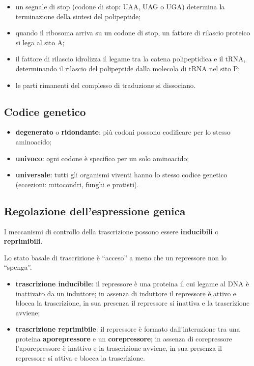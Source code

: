 \begin{itemize}
  \item un segnale di stop (codone di stop: UAA, UAG o UGA) determina la terminazione della sintesi del polipeptide;
  \item quando il ribosoma arriva su un codone di stop, un fattore di rilascio proteico si lega al sito A;
  \item il fattore di rilascio idrolizza il legame tra la catena polipeptidica e il tRNA, determinando il rilascio del polipeptide dalla molecola di tRNA nel sito P;
  \item le parti rimanenti del complesso di traduzione si dissociano.
\end{itemize}

\subsection{Codice genetico}

\begin{itemize}
  \item \textbf{degenerato} o \textbf{ridondante}: più codoni possono codificare per lo stesso aminoacido;
  \item \textbf{univoco}: ogni codone è specifico per un solo aminoacido;
  \item \textbf{universale}: tutti gli organismi viventi hanno lo stesso codice genetico (eccezioni: mitocondri, funghi e protisti).
\end{itemize}
\subsection{Regolazione dell'espressione genica}

I meccanismi di controllo della trascrizione possono essere \textbf{inducibili} o \textbf{reprimibili}.

Lo stato basale di trascrizione è ``acceso'' a meno che un repressore non lo ``spenga''.
\begin{itemize}
  \item \textbf{trascrizione inducibile}: il repressore è una proteina il cui legame al DNA è inattivato da un induttore; in assenza di induttore il repressore è attivo e blocca la trascrizione, in sua presenza il repressore si inattiva e la trascrizione avviene;
  \item \textbf{trascrizione reprimibile}: il repressore è formato dall'interazione tra una proteina \textbf{aporepressore} e un \textbf{corepressore}; in assenza di corepressore l'aporepressore è inattivo e la trascrizione avviene, in sua presenza il repressore si attiva e blocca la trascrizione.
\end{itemize}

